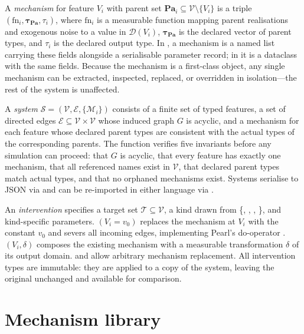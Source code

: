 \documentclass[article]{jss}
\begin{document}
A \emph{mechanism} for feature $V_i$ with parent set
$\mathbf{Pa}_i \subseteq \mathcal{V} \setminus \{V_i\}$ is a triple
$(\mathrm{fn}_i, \boldsymbol\tau_{\mathbf{Pa}}, \tau_i)$, where $\mathrm{fn}_i$
is a measurable function mapping parent realisations and exogenous noise to a
value in $\mathcal{D}(V_i)$, $\boldsymbol\tau_{\mathbf{Pa}}$ is the declared
vector of parent types, and $\tau_i$ is the declared output type. In ,
a mechanism is a named list carrying these fields alongside a serialisable
parameter record; in  it is a dataclass with the same fields.
Because the mechanism is a first-class object, any single mechanism can be
extracted, inspected, replaced, or overridden in isolation---the rest of the system
is unaffected.

A \emph{system} $\mathcal{S} = (\mathcal{V}, \mathcal{E}, \{\mathcal{M}_i\})$
consists of a finite set of typed features, a set of directed edges
$\mathcal{E} \subseteq \mathcal{V} \times \mathcal{V}$ whose induced graph $G$ is
acyclic, and a mechanism for each feature whose declared parent types are
consistent with the actual types of the corresponding parents. The function
 verifies five invariants before any simulation can proceed:
that $G$ is acyclic, that every feature has exactly one mechanism, that all
referenced names exist in $\mathcal{V}$, that declared parent types match actual
types, and that no orphaned mechanisms exist. Systems serialise to JSON via
 and can be re-imported in either language via
.

An \emph{intervention} specifies a target set $\mathcal{T} \subseteq \mathcal{V}$,
a kind drawn from \{, ,
, \}, and kind-specific parameters.
$(V_i = v_0)$ replaces the mechanism at $V_i$ with the constant
$v_0$ and severs all incoming edges, implementing Pearl's do-operator
\citep{pearl1995causal}. $(V_i, \delta)$ composes the existing
mechanism with a measurable transformation $\delta$ of its output domain.
 and  allow arbitrary
mechanism replacement. All intervention types are immutable: they are applied to a
copy of the system, leaving the original unchanged and available for comparison.

\section{Mechanism library}
\label{sec:mechanisms}
\end{document}
